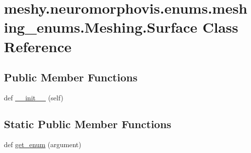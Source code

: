 \hypertarget{classmeshy_1_1neuromorphovis_1_1enums_1_1meshing__enums_1_1Meshing_1_1Surface}{}\section{meshy.\+neuromorphovis.\+enums.\+meshing\+\_\+enums.\+Meshing.\+Surface Class Reference}
\label{classmeshy_1_1neuromorphovis_1_1enums_1_1meshing__enums_1_1Meshing_1_1Surface}


 


\subsection*{Public Member Functions}
\begin{DoxyCompactItemize}
\item 
def \hyperlink{classmeshy_1_1neuromorphovis_1_1enums_1_1meshing__enums_1_1Meshing_1_1Surface_a539b67680e28491281067cb3d60ad79d}{\+\_\+\+\_\+init\+\_\+\+\_\+} (self)\hypertarget{classmeshy_1_1neuromorphovis_1_1enums_1_1meshing__enums_1_1Meshing_1_1Surface_a539b67680e28491281067cb3d60ad79d}{}\label{classmeshy_1_1neuromorphovis_1_1enums_1_1meshing__enums_1_1Meshing_1_1Surface_a539b67680e28491281067cb3d60ad79d}

\end{DoxyCompactItemize}
\subsection*{Static Public Member Functions}
\begin{DoxyCompactItemize}
\item 
def \hyperlink{classmeshy_1_1neuromorphovis_1_1enums_1_1meshing__enums_1_1Meshing_1_1Surface_a7fef652997c7c379722e13612467a1bb}{get\+\_\+enum} (argument)\hypertarget{classmeshy_1_1neuromorphovis_1_1enums_1_1meshing__enums_1_1Meshing_1_1Surface_a7fef652997c7c379722e13612467a1bb}{}\label{classmeshy_1_1neuromorphovis_1_1enums_1_1meshing__enums_1_1Meshing_1_1Surface_a7fef652997c7c379722e13612467a1bb}

\end{DoxyCompactItemize}
